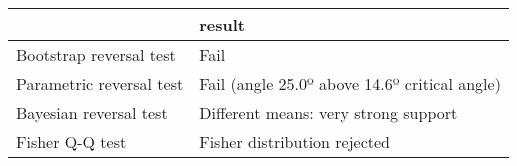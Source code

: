 \begin{tabular}{ll}
\toprule
{} &                                         result \\
\midrule
Bootstrap reversal test  &                                           Fail \\
Parametric reversal test &  Fail (angle 25.0º above 14.6º critical angle) \\
Bayesian reversal test   &           Different means: very strong support \\
Fisher Q-Q test          &                   Fisher distribution rejected \\
\bottomrule
\end{tabular}
